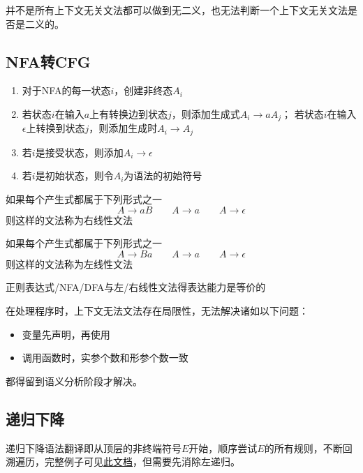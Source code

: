 并不是所有上下文无关文法都可以做到无二义，也无法判断一个上下文无关文法是否是二义的。

\subsection{NFA转CFG}
\begin{enumerate}
	\item 对于NFA的每一状态$i$，创建非终态$A_i$
	\item 若状态$i$在输入$a$上有转换边到状态$j$，则添加生成式$A_i\to aA_j$；
	若状态$i$在输入$\epsilon$上转换到状态$j$，则添加生成时$A_i\to A_j$
	\item 若$i$是接受状态，则添加$A_i\to\epsilon$
	\item 若$i$是初始状态，则令$A_i$为语法的初始符号
\end{enumerate}

\begin{definition}[右线性文法]
如果每个产生式都属于下列形式之一
\[A\to aB\qquad A\to a\qquad A\to\epsilon\]
则这样的文法称为右线性文法
\end{definition}
\begin{definition}[左线性文法]
如果每个产生式都属于下列形式之一
\[A\to Ba\qquad A\to a\qquad A\to\epsilon\]
则这样的文法称为左线性文法
\end{definition}
\begin{theorem}
正则表达式/NFA/DFA与左/右线性文法得表达能力是等价的
\end{theorem}

在处理程序时，上下文无法文法存在局限性，无法解决诸如以下问题：
\begin{itemize}
\item 变量先声明，再使用
\item 调用函数时，实参个数和形参个数一致
\end{itemize}
都得留到语义分析阶段才解决。

\subsection{递归下降}
递归下降语法翻译即从顶层的非终端符号$E$开始，顺序尝试$E$的所有规则，不断回溯遍历，完整例子可见\href{http://web.stanford.edu/class/cs143/lectures/lecture06.pdf}{此文档}，但需要先消除左递归。

